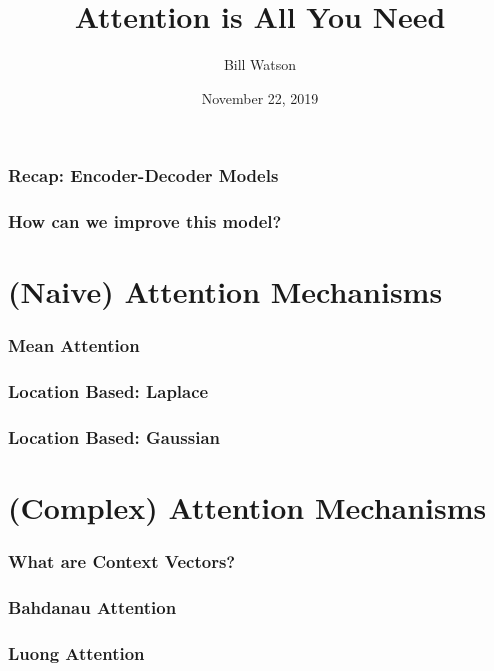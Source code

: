 \documentclass{beamer}
\title{Attention is All You Need}
\author{Bill Watson}
\institute{S\&P Global}
\date{November 22, 2019}
\begin{document}
\begin{frame}
\titlepage
\end{frame}


\begin{frame}
\frametitle{Recap: Encoder-Decoder Models}

\end{frame}

\begin{frame}
\frametitle{How can we improve this model?}

\end{frame}

\section{(Naive) Attention Mechanisms}

\begin{frame}
\frametitle{Mean Attention}

\end{frame}

\begin{frame}
\frametitle{Location Based: Laplace}

\end{frame}

\begin{frame}
\frametitle{Location Based: Gaussian}

\end{frame}


\section{(Complex) Attention Mechanisms}

\begin{frame}
\frametitle{What are Context Vectors?}

\end{frame}


\begin{frame}
\frametitle{Bahdanau Attention}

\end{frame}


\begin{frame}
\frametitle{Luong Attention}

\end{frame}
\end{document}
